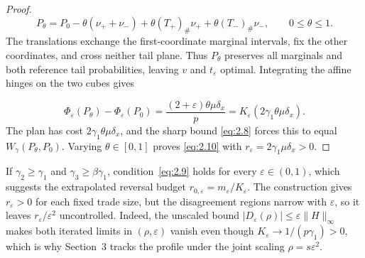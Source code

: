\begin{proof}
\begin{equation}
P_\theta=P_0-\theta(\nu_++\nu_-)
+\theta(T_+)_\#\nu_++\theta(T_-)_\#\nu_-,\qquad 0\le\theta\le1.
\tag{2.13}\label{eq:2.13}
\end{equation}
The translations exchange the first-coordinate marginal intervals, fix the other coordinates, and cross neither tail plane. Thus \(P_\theta\) preserves all marginals and both reference tail probabilities, leaving \(v\) and \(t_\varepsilon\) optimal. Integrating the affine hinges on the two cubes gives

\begin{equation}
\Phi_\varepsilon(P_\theta)-\Phi_\varepsilon(P_0)
=\frac{(2+\varepsilon)\theta\mu\delta_x}{p}
=K_\varepsilon(2\gamma_1\theta\mu\delta_x).
\tag{2.14}\label{eq:2.14}
\end{equation}
The plan has cost \(2\gamma_1\theta\mu\delta_x\), and the sharp bound \eqref{eq:2.8} forces this to equal \(W_\gamma(P_\theta,P_0)\). Varying \(\theta\in[0,1]\) proves \eqref{eq:2.10} with \(r_\varepsilon=2\gamma_1\mu\delta_x>0\).
\end{proof}

If \(\gamma_2\ge\gamma_1\) and \(\gamma_3\ge\beta\gamma_1\), condition~\eqref{eq:2.9} holds for every \(\varepsilon\in(0,1)\), which suggests the extrapolated reversal budget \(r_{0,\varepsilon}=m_\varepsilon/K_\varepsilon\). The construction gives \(r_\varepsilon>0\) for each fixed trade size, but the disagreement regions narrow with \(\varepsilon\), so it leaves \(r_\varepsilon/\varepsilon^2\) uncontrolled. Indeed, the unscaled bound \(|D_\varepsilon(\rho)|\le\varepsilon\|H\|_\infty\) makes both iterated limits in \((\rho,\varepsilon)\) vanish even though \(K_\varepsilon\to1/(p\gamma_1)>0\), which is why Section~3 tracks the profile under the joint scaling \(\rho=s\varepsilon^2\).

